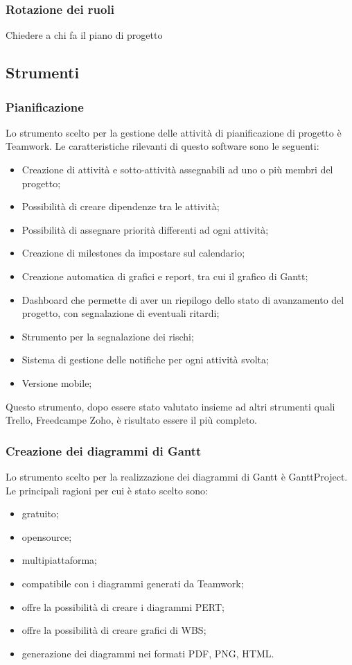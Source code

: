 \documentclass[../NormeProgetto.tex]{subfiles}
\begin{document}
		\subsubsection{Rotazione dei ruoli}
		Chiedere a chi fa il piano di progetto
		
		
		\subsection{Strumenti}
		
		\subsubsection{Pianificazione} \label{sec: Pianificazione Teamwork}
		Lo strumento scelto per la gestione delle attività di pianificazione di progetto è Teamwork. Le caratteristiche rilevanti di questo software sono le seguenti:
		\begin{itemize}
		\item Creazione di attività e sotto-attività assegnabili ad uno o più membri del progetto;
		\item Possibilità di creare dipendenze tra le attività;
		\item Possibilità di assegnare priorità differenti ad ogni attività;
		\item Creazione di milestones da impostare sul calendario;
		\item Creazione automatica di grafici e report, tra cui il grafico di Gantt;
		\item Dashboard che permette di aver un riepilogo dello stato di avanzamento del progetto, con segnalazione di eventuali ritardi;
		\item Strumento per la segnalazione dei rischi;
		\item Sistema di gestione delle notifiche per ogni attività svolta;
		\item Versione mobile;
		\end{itemize}		 
Questo strumento, dopo essere stato valutato insieme ad altri strumenti quali Trello, Freedcampe Zoho, è risultato essere il più completo.
		
		\subsubsection{Creazione dei diagrammi di Gantt}
		Lo strumento scelto per la realizzazione dei diagrammi di Gantt è GanttProject. Le principali ragioni per cui è stato scelto sono:
		\begin{itemize}
			\item gratuito;
			\item opensource;
			\item multipiattaforma;
			\item compatibile con i diagrammi generati da Teamwork;
			\item offre la possibilità di creare i diagrammi PERT;
			\item offre la possibilità di creare grafici di WBS;
			\item generazione dei diagrammi nei formati PDF, PNG, HTML.
		\end{itemize}
		
\end{document}
